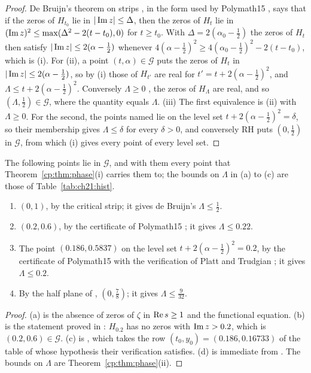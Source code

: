 \begin{proof}
De Bruijn's theorem on strips \cite[Theorem 13]{deBruijn}, in the form used by Polymath15 \cite{Polymath}, says that if the zeros of $H_{t_0}$ lie in $|\operatorname{Im} z|\le\Delta$, then the zeros of $H_t$ lie in $(\operatorname{Im} z)^2\le\max(\Delta^2-2(t-t_0),0)$ for $t\ge t_0$. With $\Delta=2(\alpha_0-\frac12)$ the zeros of $H_t$ then satisfy $|\operatorname{Im} z|\le2(\alpha-\frac12)$ whenever $4(\alpha-\frac12)^2\ge4(\alpha_0-\frac12)^2-2(t-t_0)$, which is (i). For (ii), a point $(t,\alpha)\in\mathcal G$ puts the zeros of $H_t$ in $|\operatorname{Im} z|\le2(\alpha-\frac12)$, so by (i) those of $H_{t'}$ are real for $t'=t+2(\alpha-\frac12)^2$, and $\Lambda\le t+2(\alpha-\frac12)^2$. Conversely $\Lambda\ge0$ \cite{RodgersTao}, the zeros of $H_\Lambda$ are real, and so $(\Lambda,\frac12)\in\mathcal G$, where the quantity equals $\Lambda$. (iii) The first equivalence is (ii) with $\Lambda\ge0$. For the second, the points named lie on the level set $t+2(\alpha-\frac12)^2=\delta$, so their membership gives $\Lambda\le\delta$ for every $\delta>0$, and conversely RH puts $(0,\frac12)$ in $\mathcal G$, from which (i) gives every point of every level set.
\end{proof}

\begin{corollary}\label{cp:cor:known}
The following points lie in $\mathcal G$, and with them every point that Theorem~\ref{cp:thm:phase}(i) carries them to; the bounds on $\Lambda$ in (a) to (c) are those of Table~\ref{tab:ch21:hist}.
\begin{enumerate}
\item[(a)] $(0,1)$, by the critical strip; it gives de Bruijn's $\Lambda\le\frac12$.
\item[(b)] $(0.2,0.6)$, by the certificate of Polymath15 \cite{Polymath}; it gives $\Lambda\le0.22$.
\item[(c)] The point $(0.186,0.5837)$ on the level set $t+2(\alpha-\frac12)^2=0.2$, by the certificate of Polymath15 with the verification of Platt and Trudgian \cite{PT21}; it gives $\Lambda\le0.2$.
\item[(d)] By the half plane of \cite{OAI26a}, $(0,\frac78)$; it gives $\Lambda\le\frac9{32}$.
\end{enumerate}
\end{corollary}

\begin{proof}
(a) is the absence of zeros of $\zeta$ in $\operatorname{Re} s\ge1$ and the functional equation. (b) is the statement proved in \cite{Polymath}: $H_{0.2}$ has no zeros with $\operatorname{Im} z>0.2$, which is $(0.2,0.6)\in\mathcal G$. (c) is \cite{PT21}, which takes the row $(t_0,y_0)=(0.186,0.16733)$ of the table of \cite{Polymath} whose hypothesis their verification satisfies. (d) is immediate from \cite{OAI26a}. The bounds on $\Lambda$ are Theorem~\ref{cp:thm:phase}(ii).
\end{proof}

